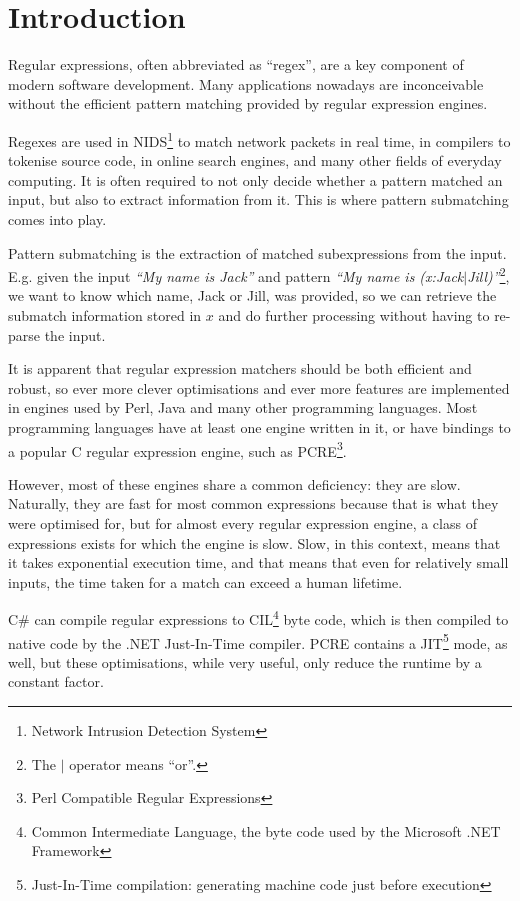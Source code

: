 \chapter{Introduction}

Regular expressions, often abbreviated as ``regex'', are a key component of
modern software development. Many applications nowadays are inconceivable
without the efficient pattern matching provided by regular expression engines.

Regexes are used in NIDS\footnote{Network Intrusion Detection System} to match
network packets in real time, in compilers to tokenise source code, in online
search engines, and many other fields of everyday computing. It is often
required to not only decide whether a pattern matched an input, but also to
extract information from it. This is where pattern submatching comes into play.

Pattern submatching is the extraction of matched subexpressions from the input.
E.g. given the input \textit{``My name is Jack''} and pattern \textit{``My name
is (x:Jack$|$Jill)''}\footnote{The $|$ operator means ``or''.}, we want to know
which name, Jack or Jill, was provided, so we can retrieve the submatch
information stored in $x$ and do further processing without having to re-parse
the input.

It is apparent that regular expression matchers should be both efficient and
robust, so ever more clever optimisations and ever more features are implemented
in engines used by Perl, Java and many other programming languages. Most
programming languages have at least one engine written in it, or have bindings
to a popular C regular expression engine, such as PCRE\footnote{Perl Compatible
Regular Expressions}.

However, most of these engines share a common deficiency: they are slow.
Naturally, they are fast for most common expressions because that is what they
were optimised for, but for almost every regular expression engine, a class of
expressions exists for which the engine is slow. Slow, in this context, means
that it takes exponential execution time, and that means that even for
relatively small inputs, the time taken for a match can exceed a human lifetime.

C\# can compile regular expressions to CIL\footnote{Common Intermediate
Language, the byte code used by the Microsoft .NET Framework} byte code, which
is then compiled to native code by the .NET Just-In-Time compiler. PCRE contains
a JIT\footnote{Just-In-Time compilation: generating machine code just before
execution} mode, as well, but these optimisations, while very useful, only
reduce the runtime by a constant factor.

